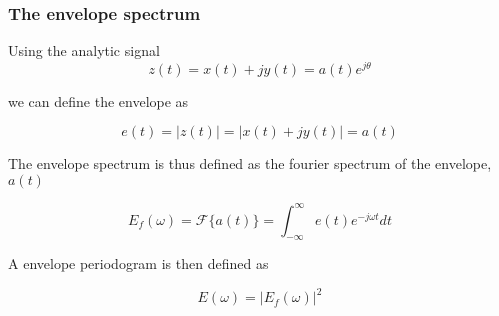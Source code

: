 \begin{frame}
    \frametitle{The envelope spectrum}
    \small
    
    Using the analytic signal
    \begin{equation}
        z(t)=x(t)+jy(t) = a(t) e^{j\theta}
    \end{equation}
    
    we can define the envelope as
    
    \begin{equation}
       e(t) = |z(t)| = | x(t) + jy(t) | = a(t)
    \end{equation}
   
   The envelope spectrum is thus defined as the fourier spectrum of the envelope, $a(t)$
   
   \begin{equation}
       E_{f}(\omega) = \mathscr{F}\{a(t)\} = \int_{-\infty}^{\infty} e(t) e^{-j\omega t} dt
   \end{equation}
   
   A envelope periodogram is then defined as 
   
   \begin{equation}
       E(\omega) = |E_{f}(\omega)|^2
   \end{equation}
   
\end{frame}